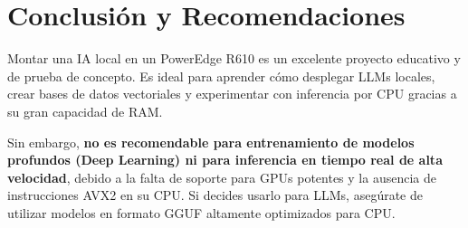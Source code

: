 \documentclass[12pt,a4paper]{article}
\begin{document}
\section{Conclusión y Recomendaciones}
Montar una IA local en un PowerEdge R610 es un excelente proyecto educativo y de prueba de concepto. Es ideal para aprender cómo desplegar LLMs locales, crear bases de datos vectoriales y experimentar con inferencia por CPU gracias a su gran capacidad de RAM.

Sin embargo, \textbf{no es recomendable para entrenamiento de modelos profundos (Deep Learning) ni para inferencia en tiempo real de alta velocidad}, debido a la falta de soporte para GPUs potentes y la ausencia de instrucciones AVX2 en su CPU. Si decides usarlo para LLMs, asegúrate de utilizar modelos en formato GGUF altamente optimizados para CPU.
\end{document}
